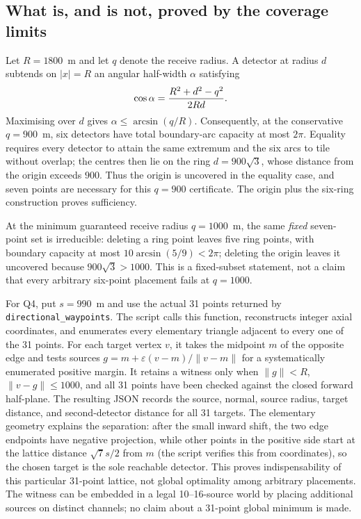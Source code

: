 \subsection{What is, and is not, proved by the coverage limits}
\label{sec:coverage-limits}
Let $R=1800$~m and let $q$ denote the receive radius.  A detector at
radius $d$ subtends on $|x|=R$ an angular half-width $\alpha$ satisfying
\[
 \cos\alpha={R^2+d^2-q^2\over 2Rd}.
\]
Maximising over $d$ gives $\alpha\leq\arcsin(q/R)$.  Consequently, at the
conservative $q=900$~m, six detectors have total boundary-arc capacity at
most $2\pi$.  Equality requires every detector to attain the same extremum
and the six arcs to tile without overlap; the centres then lie on the ring
$d=900\sqrt3$, whose distance from the origin exceeds $900$.  Thus the
origin is uncovered in the equality case, and seven points are necessary for
this $q=900$ certificate.  The origin plus the six-ring construction proves
sufficiency.

At the minimum guaranteed receive radius $q=1000$~m, the same
\emph{fixed} seven-point set is irreducible: deleting a ring point leaves five
ring points, with boundary capacity at most $10\arcsin(5/9)<2\pi$; deleting the
origin leaves it uncovered because $900\sqrt3>1000$.  This is a
fixed-subset statement, not a claim that every arbitrary six-point placement
fails at $q=1000$.

For Q4, put $s=990$~m and use the actual 31 points returned by
\texttt{directional\_waypoints}.  The script calls this function, reconstructs
integer axial coordinates, and enumerates every elementary triangle adjacent
to every one of the 31 points.  For each target vertex $v$, it takes the
midpoint $m$ of the opposite edge and tests sources
$g=m+\varepsilon(v-m)/\lVert v-m\rVert$ for a systematically enumerated
positive margin.  It retains a witness only when $\lVert g\rVert<R$,
$\lVert v-g\rVert\leq1000$, and all 31 points have been checked against the
closed forward half-plane.  The resulting JSON records the source,
normal, source radius, target distance, and second-detector distance for all
31 targets.  The elementary geometry explains the separation: after the
small inward shift, the two edge endpoints have negative projection, while
other points in the positive side start at the lattice distance
$\sqrt7s/2$ from $m$ (the script verifies this from coordinates), so the
chosen target is the sole reachable detector.  This proves indispensability
of this particular 31-point lattice, not global optimality among arbitrary
placements.  The witness can be embedded in a legal 10--16-source world by
placing additional sources on distinct channels; no claim about a 31-point
global minimum is made.

